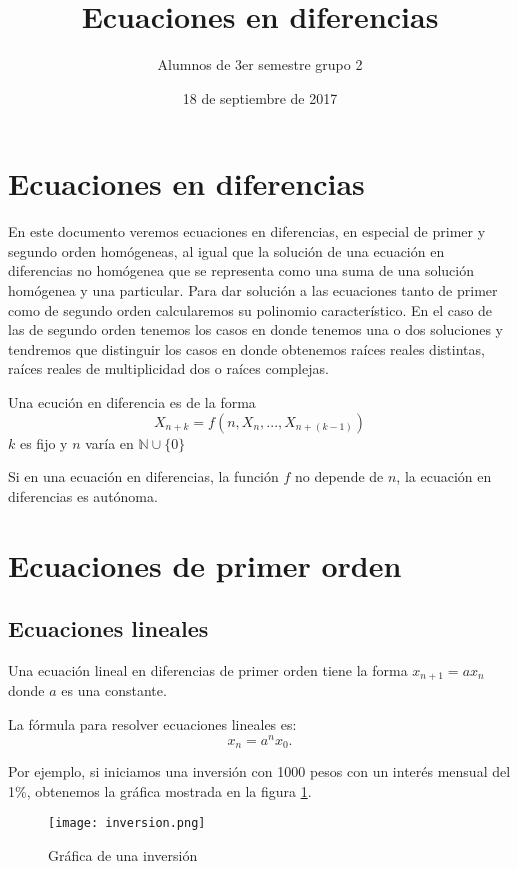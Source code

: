\documentclass{article}
\title{Ecuaciones en diferencias}
\author{Alumnos de 3er semestre grupo 2}
\date{18 de septiembre de 2017}
\begin{document}
\maketitle
\tableofcontents

\section{Ecuaciones en diferencias}
\label{sec:ecuaciones}

En este documento veremos ecuaciones en diferencias, en especial de
primer y segundo orden homógeneas, al igual que la solución de una
ecuación en diferencias no homógenea que se representa como una suma
de una solución homógenea y una particular.  Para dar solución a las
ecuaciones tanto de primer como de segundo orden calcularemos su
polinomio característico. En el caso de las de segundo orden tenemos
los casos en donde tenemos una o dos soluciones y tendremos que
distinguir los casos en donde obtenemos raíces reales distintas, raíces
reales de multiplicidad dos o raíces complejas.

Una ecución en diferencia es de la forma $$X_{n+k}=f(n,X_n,...,X_{n+(k-1)})$$
$k$ es fijo y $n$ varía en $\mathbb{N}\cup\{0\}$

Si en una ecuación en diferencias, la función $f$ no depende de $n$,
la ecuación en diferencias es autónoma.

\section{Ecuaciones de primer orden}

\subsection{Ecuaciones lineales}

Una ecuación lineal en diferencias de primer orden tiene la forma
$x_{n+1}=ax_n$ donde $a$ es una constante.

La fórmula para resolver ecuaciones lineales es:
\begin{equation}
  \label{lineal}
  x_n=a^nx_0.
\end{equation}

Por ejemplo, si iniciamos una inversión con 1000 pesos con un interés
mensual del 1\%, obtenemos la gráfica mostrada en la figura
\ref{inversion}.

\begin{figure}
  \centering
  \texttt{[image: inversion.png]}
  \caption{Gráfica de una inversión}
  \label{inversion}
\end{figure}
\end{document}

